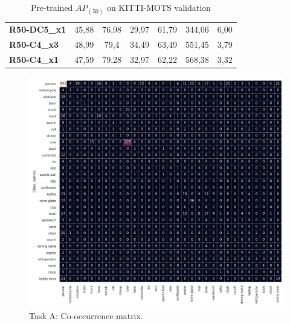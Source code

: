 \documentclass[11pt,a4paper,twocolumn,twoside]{article}
\begin{document}
\begin{table}[hbt]
\begin{tabularx}{\textwidth}{lcccccc}
\multicolumn{1}{|l|}{\textbf{R50-DC5\_x1}}  & \multicolumn{1}{c|}{45,88}      & \multicolumn{1}{c|}{76,98}        & \multicolumn{1}{c|}{29,97}             & 61,79                               & 344,06                                    & 6,00                                       \\ \cline{1-7}
\multicolumn{1}{|l|}{\textbf{R50-C4\_x3}}   & \multicolumn{1}{c|}{48,99}      & \multicolumn{1}{c|}{79,4}         & \multicolumn{1}{c|}{34,49}             & 63,49                               & 551,45                                    & 3,79                                       \\ \cline{1-7}
\multicolumn{1}{|l|}{\textbf{R50-C4\_x1}}   & \multicolumn{1}{c|}{47,59}      & \multicolumn{1}{c|}{79,28}        & \multicolumn{1}{c|}{32,97}             & 62,22                               & 568,38                                    & 3,32                                       \\\cline{1-7}
\end{tabularx}
\caption{Pre-trained $AP_{(50)}$ on KITTI-MOTS validation}
\label{table:week4_taskA_COCO}
\end{table}


\begin{figure}[hbt]
    \includegraphics[width=\textwidth,height=\textheight,keepaspectratio]{Resources/Images/task_a_cooc.png}
    \caption{Task A: Co-occurrence matrix.}
    \label{fig:task_a_cooc}
\end{figure}
\end{document}
